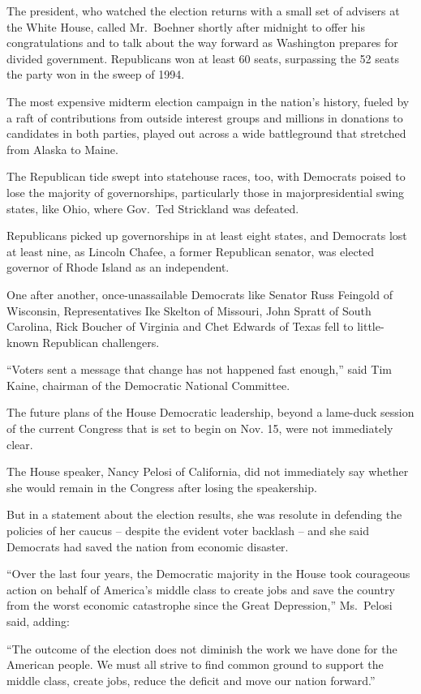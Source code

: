 ﻿\documentclass[12pt]{article}
\begin{document}
The president, who watched the election returns with a small set of advisers at the White House,
called Mr.~Boehner shortly after midnight to offer his congratulations and to talk about the way
forward as Washington prepares for divided government. Republicans won at least 60 seats, surpassing
the 52 seats the party won in the sweep of 1994.

The most expensive midterm election campaign in the nation's history, fueled by a raft of
contributions from outside interest groups and millions in donations to candidates in both parties,
played out across a wide battleground that stretched from Alaska to Maine.

The Republican tide swept into statehouse races, too, with Democrats poised to lose the majority of
governorships, particularly those in majorpresidential swing states, like Ohio, where Gov.~Ted
Strickland was defeated.

Republicans picked up governorships in at least eight states, and Democrats lost at least nine, as
Lincoln Chafee, a former Republican senator, was elected governor of Rhode Island as an independent.

One after another, once-unassailable Democrats like Senator Russ Feingold of Wisconsin,
Representatives Ike Skelton of Missouri, John Spratt of South Carolina, Rick Boucher of Virginia and
Chet Edwards of Texas fell to little-known Republican challengers.

``Voters sent a message that change has not happened fast enough,'' said Tim Kaine, chairman of the
Democratic National Committee.

The future plans of the House Democratic leadership, beyond a lame-duck session of the current
Congress that is set to begin on Nov. 15, were not immediately clear.

The House speaker, Nancy Pelosi of California, did not immediately say whether she would remain in
the Congress after losing the speakership.

But in a statement about the election results, she was resolute in defending the policies of her
caucus -- despite the evident voter backlash -- and she said Democrats had saved the nation from
economic disaster.

``Over the last four years, the Democratic majority in the House took courageous action on behalf of
America's middle class to create jobs and save the country from the worst economic catastrophe since
the Great Depression,'' Ms.~Pelosi said, adding:

``The outcome of the election does not diminish the work we have done for the American people. We
must all strive to find common ground to support the middle class, create jobs, reduce the deficit
and move our nation forward.''
\end{document}

